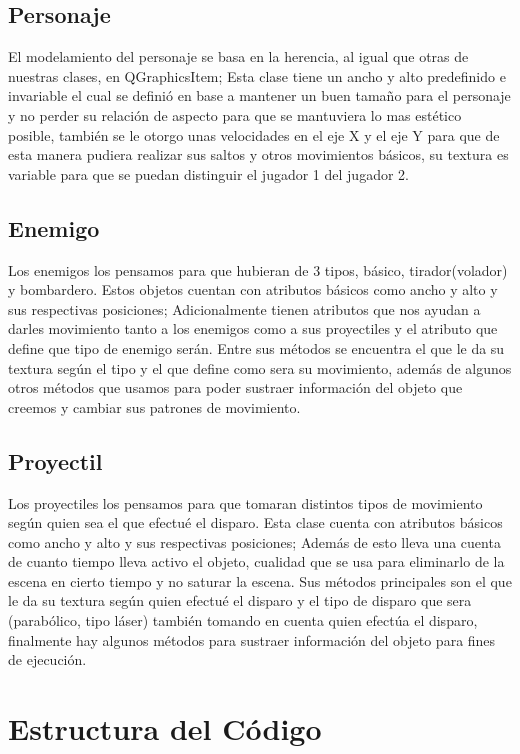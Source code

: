 \documentclass{article}
\begin{document}
    \subsection{Personaje}
    El modelamiento del personaje se basa en la herencia, al igual que otras de nuestras clases, en QGraphicsItem; Esta clase tiene un ancho y alto predefinido e invariable el cual se definió en base a mantener un buen tamaño para el personaje y no perder su relación de aspecto para que se mantuviera lo mas estético posible, también se le otorgo unas velocidades en el eje X y el eje Y para que de esta manera pudiera realizar sus saltos y otros movimientos básicos, su textura es variable para que se puedan distinguir el jugador 1 del jugador 2.
    
    \subsection{Enemigo}
    Los enemigos los pensamos para que hubieran de 3 tipos, básico, tirador(volador) y bombardero. Estos objetos cuentan con atributos básicos como ancho y alto y sus respectivas posiciones; Adicionalmente tienen atributos que nos ayudan a darles movimiento tanto a los enemigos como a sus proyectiles y el atributo que define que tipo de enemigo serán. Entre sus métodos se encuentra el que le da su textura según el tipo y el que define como sera su movimiento, además de algunos otros métodos que usamos para poder sustraer información del objeto que creemos y cambiar sus patrones de movimiento.
    
    \subsection{Proyectil}
    Los proyectiles los pensamos para que tomaran distintos tipos de movimiento según quien sea el que efectué el disparo. Esta clase cuenta con atributos básicos como ancho y alto y sus respectivas posiciones; Además de esto lleva una cuenta de cuanto tiempo lleva activo el objeto, cualidad que se usa para eliminarlo de la escena en cierto tiempo y no saturar la escena. Sus métodos principales son el que le da su textura según quien efectué el disparo y el tipo de disparo que sera (parabólico, tipo láser) también tomando en cuenta quien efectúa el disparo, finalmente hay algunos métodos para sustraer información del objeto para fines de ejecución.
    
        
\section{Estructura del Código}
\end{document}
